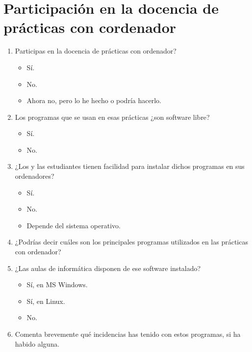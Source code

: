 \documentclass[a4paper,12pt]{article}
\newcounter{preg}[section]
\begin{document}
\section{Participación en la docencia de prácticas con cordenador}
\begin{enumerate}
\item {} Participas en la docencia de prácticas con ordenador?
   \begin{itemize}
   \item Sí.
   \item No.
   \item Ahora no, pero lo he hecho o podría hacerlo.
   \end{itemize}

\item {} Los programas que se usan en esas prácticas ¿son software libre?
      \begin{itemize}
      \item Sí.
      \item No.
      \end{itemize}

\item {} ¿Los y las estudiantes tienen facilidad para instalar dichos programas en sus ordenadores?
      \begin{itemize}
      \item Sí.
      \item No.
      \item Depende del sistema operativo.
      \end{itemize}

\item {} ¿Podrías decir cuáles son los principales programas utilizados en las prácticas con ordenador?
   \vspace*{1cm}

\item {} ¿Las aulas de informática disponen de ese software instalado?
      \begin{itemize}
      \item Sí, en MS Windows.
      \item Sí, en Linux.
      \item No.
      \end{itemize}

\item {} Comenta brevemente qué incidencias has tenido con estos programas, si ha habido alguna.
\vspace*{1cm}
\end{enumerate}
\end{document}
